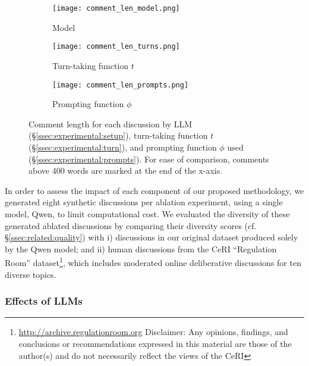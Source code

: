 \begin{figure*}[t]
    \begin{subfigure}{0.32\linewidth}
        \texttt{[image: comment\_len\_model.png]}
        \caption{Model}
        \label{fig:comment_length_model}
    \end{subfigure}%
    \hfill
    \begin{subfigure}{0.32\linewidth}
        \texttt{[image: comment\_len\_turns.png]}
        \caption{Turn-taking function $t$}
        \label{fig:comment_length_turns}
    \end{subfigure}%
    \hfill
    \begin{subfigure}{0.32\linewidth}
        \texttt{[image: comment\_len\_prompts.png]}
        \caption{Prompting function $\phi$}
        \label{fig:comment_length_prompts}
    \end{subfigure}%

    \caption{Comment length for each discussion by \ac{LLM} (\S\ref{ssec:experimental:setup}), turn-taking function $t$ (\S\ref{ssec:experimental:turn}), and prompting function $\phi$ used (\S\ref{ssec:experimental:prompts}). For ease of comparison, comments above 400 words are marked at the end of the x-axis.}
    \label{fig:comment_length}
\end{figure*}


In order to assess the impact of each component of our proposed methodology, we generated eight synthetic discussions per ablation experiment, using a single model, Qwen, to limit computational cost. We evaluated the diversity of these generated ablated discussions by comparing their diversity scores (cf. \S\ref{ssec:related:quality}) with i) discussions in our original dataset produced solely by the Qwen model; and ii) human discussions from the \ac{CeRI} “Regulation Room” dataset\footnote{\url{http://archive.regulationroom.org} Disclaimer: Any opinions, findings, and conclusions or recommendations expressed in this material are those of the author(s) and do not necessarily reflect the views of the \ac{CeRI}}, which includes moderated online deliberative discussions for ten diverse topics.


\subsubsection{Effects of LLMs}

